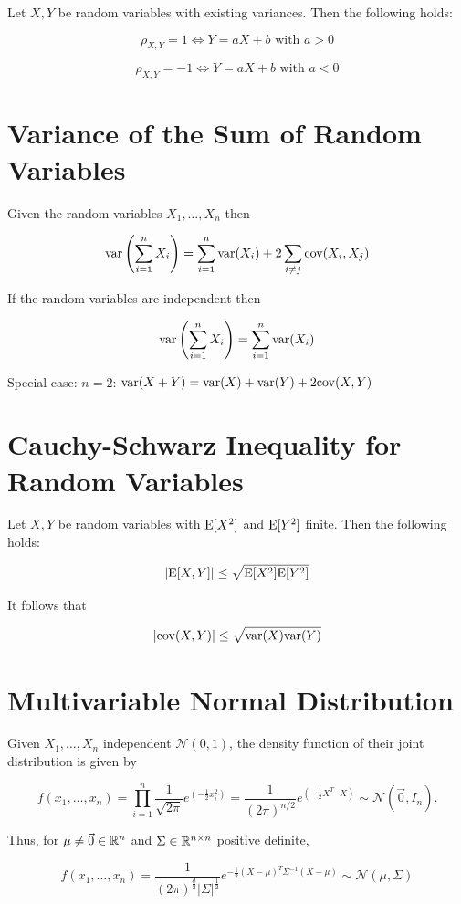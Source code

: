 Let \(X, Y\) be random variables with existing variances. Then the following holds:

\[
    \rho_{X,Y} = 1 \iff Y = aX + b \text{ with } a > 0
\]

\[
    \rho_{X,Y} = -1 \iff Y = aX + b \text{ with } a < 0
\]

\section{Variance of the Sum of Random Variables}

Given the random variables \(X_1, \dots, X_n\) then

\[
    \mathrm{var}\left(\sum_{i=1}^n X_i\right) = \sum_{i=1}^n \mathrm{var}(X_i) + 2 \sum_{i \ne j} \mathrm{cov}(X_i, X_j)
\]

If the random variables are independent then

\[
    \mathrm{var}\left(\sum_{i=1}^n X_i\right) = \sum_{i=1}^n \mathrm{var}(X_i)
\]

Special case: \(n = 2\): \(\mathrm{var}(X + Y) = \mathrm{var}(X) + \mathrm{var}(Y) + 2 \mathrm{cov}(X, Y)\)

\section{Cauchy-Schwarz Inequality for Random Variables}

Let \(X, Y\) be random variables with \(\mathrm{E}[X^2]\) and \(\mathrm{E}[Y^2]\) finite.
Then the following holds:

\[
    |\mathrm{E}[X, Y]| \le \sqrt{\mathrm{E}[X^2] \mathrm{E}[Y^2]}
\]

It follows that

\[
    |\mathrm{cov}(X, Y)| \le \sqrt{\mathrm{var}(X) \mathrm{var}(Y)}
\]

\section{Multivariable Normal Distribution}

Given \(X_1, \dots, X_n\) independent \(\mathcal{N}(0,1)\), the density function of their joint distribution is given by

\[
    f(x_1, \dots ,x_n) = \prod_{i = 1}^{n} \frac{1}{\sqrt{2\pi}} e^{\left(-\frac{1}{2}x_{i}^{2}\right)} = \frac{1}{(2\pi)^{n/2}} e^{\left(-\frac{1}{2} X^T \cdot X\right)} 
    \sim \mathcal{N}(\vec{0}, I_n).
\]

Thus, for \(\mu \ne \vec{0} \in \mathbb{R}^n\) and \(\Sigma \in \mathbb{R}^{n \times n}\) positive definite,

\[
    f(x_1, \dots ,x_n) = \frac{1}{(2\pi)^{\frac{d}{2}} |\Sigma|^{\frac{1}{2}}} e^{-\frac{1}{2} (X - \mu)^T \Sigma^{-1}(X - \mu)} \sim \mathcal{N}(\mu, \Sigma)
\]

